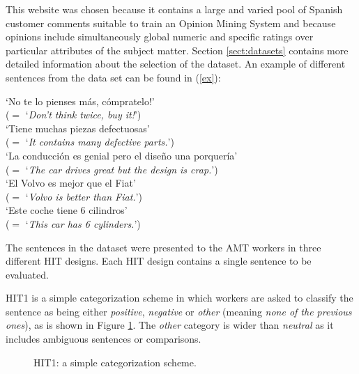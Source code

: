 \documentclass[11pt, a4paper,onecolumn]{article}
\begin{document}
This website was chosen because it contains a large and varied pool of Spanish customer comments suitable to train an Opinion Mining System and because opinions include simultaneously global numeric and specific ratings over particular attributes of the subject matter. Section \ref{sect:datasets} contains more detailed information about the selection of the dataset. An example of different sentences from the data set can be found in (\ref{ex}):

\begin{li}
  \label{ex}
  `No te lo pienses m\'{a}s, c\'{o}mpratelo!'\\
  ($=$ `\textit{Don't think twice, buy it!}')\\
   `Tiene muchas piezas defectuosas'\\
  ($=$ `\textit{It contains many defective parts.}')\\ 	
   `La conducci\'on es genial pero el dise\~no una porquer\'ia'\\
  ($=$ `\textit{The car drives great but the design is crap.}')\\ 
   `El Volvo es mejor que el Fiat'\\
  ($=$ `\textit{Volvo is better than Fiat.}')\\ 
 `Este coche tiene 6 cilindros'\\
  ($=$ `\textit{This car has 6 cylinders.}')\\ 		
\end{li}


The sentences in the dataset were presented to the AMT workers in three different HIT designs. Each HIT design contains a single sentence to be evaluated. 

HIT1 is a simple categorization scheme in which workers are asked to classify the sentence as being either \textit{positive}, \textit{negative} or \textit{other} (meaning \textit{none of the previous ones}), as is shown in Figure \ref{hit1}. The \textit{other} category is wider than
\textit{neutral} as it includes ambiguous sentences or comparisons.


\begin{figure}[ht]
  \begin{center}
	\caption{HIT1: a simple categorization scheme.}
	\label{hit1}
  \end{center}
\end{figure}
\end{document}
